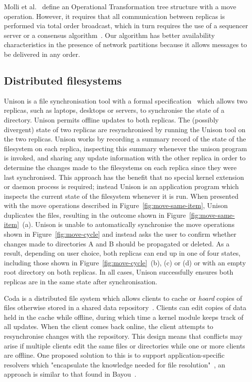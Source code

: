 \documentclass[sigconf]{acmart}
\begin{document}
Molli et al.~\cite{Molli:2003cd} define an Operational Transformation tree structure with a move operation.
However, it requires that all communication between replicas is performed via total order broadcast, which in turn requires the use of a sequencer server or a consensus algorithm~\cite{Chandra:1996cp}.
Our algorithm has better availability characteristics in the presence of network partitions because it allows messages to be delivered in any order.

\subsection{Distributed filesystems}\label{sec:filesystems}

Unison is a file synchronisation tool with a formal specification~\cite{PierceVouillon:UnisonSpecTR} which allows two replicas, such as laptops, desktops or servers, to synchronise the state of a directory. 
Unison permits offline updates to both replicas. 
The (possibly divergent) state of two replicas are resynchronised by running the Unison tool on the two replicas. 
Unison works by recording a summary record of the state of the filesystem on each replica,  inspecting this summary whenever the unison program is invoked, and sharing any update information with the other replica in order to determine the changes made to the filesystems on each replica since they were last synchronised. 
This approach has the benefit that no special kernel extension or daemon process is required; instead Unison is an application program which inspects the current state of the filesystem whenever it is run. 
When presented with the move operations described in Figure~\ref{fig:move-same-item}, Unison duplicates the files, resulting in the outcome shown in Figure~\ref{fig:move-same-item}~(a). 
Unison is unable to automatically synchronise the move operations shown in Figure~\ref{fig:move-cycle} and instead asks the user to confirm whether changes made to directories A and B should be propagated or deleted. 
As a result, depending on user choice, both replicas can end up in one of four states, including those shown in Figure~\ref{fig:move-cycle}~(b), (c) or (d) or with an empty root directory on both replicas. 
In all cases, Unison successfully ensures both replicas are in the same state after synchronisation.

Coda is a distributed file system which allows clients to cache or \emph{hoard} copies of files otherwise stored in a shared data repository~\cite{kistler1992coda}. 
Clients can edit copies of data held in the cache while offline, during which time a kernel module keeps track of all updates. 
When the client comes back online, the client attempts to resynchronise changes with the repository. 
This design means that conflicts may arise if multiple clients edit the same files or directories while one or more clients are offline. 
One proposed solution to this is to support application-specific resolvers which "encapsulate the knowledge needed for file resolution"~\cite{Kumar:1995wf}, an approach is similar to that found in Bayou~\cite{Terry:1995dn}.
\end{document}
